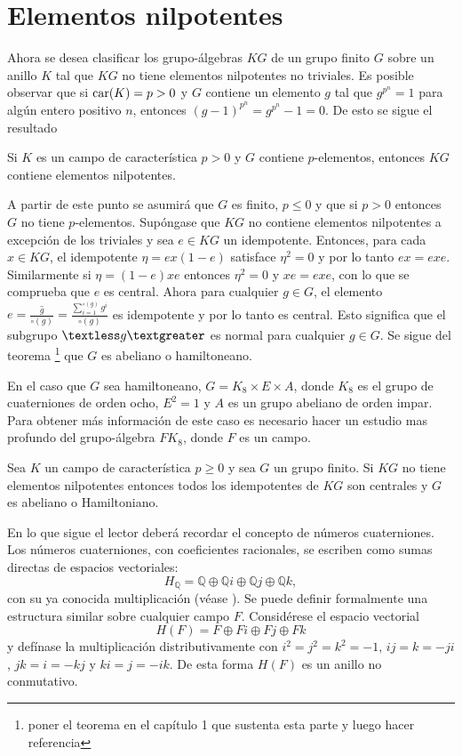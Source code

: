 \section{\quad Elementos nilpotentes}
Ahora se desea clasificar los grupo-álgebras $KG$ de un grupo finito $G$ sobre un anillo $K$ tal que $KG$ no tiene elementos nilpotentes no triviales. Es posible observar que si $\operatorname{car}(K) = p > 0$ y $G$ contiene un elemento $g$ tal que $g^{p^{n}} = 1$ para algún entero positivo $n$, entonces $(g - 1 )^{p^{n}} = g^{p^{n}} - 1 = 0$. De esto se sigue el resultado
\begin{proposicion}\label{prop:nilpotentes}
Si $K$ es un campo de característica $p > 0 $ y $G$ contiene $p$-elementos, entonces $KG$ contiene elementos nilpotentes.  
\end{proposicion}
A partir de este punto se asumirá que $G$ es finito, $p 
\leq 0$ y que si $p >0 $ entonces $G$ no tiene $p$-elementos. Supóngase que $KG$ no contiene elementos nilpotentes a excepción de los triviales y sea $e \in KG$ un idempotente. Entonces, para cada $x \in KG$, el idempotente $\eta = ex(1-e)$ satisface $\eta^2 = 0$ y por lo tanto $ ex = exe $. Similarmente si $\eta = (1 - e)xe$ entonces $\eta^2 = 0$ y $xe = exe$, con lo que se comprueba que $e$ es central. Ahora para cualquier $g \in G$, el elemento $e = \frac{\hat{g}}{\circ (g)} = \frac{\sum_{i = 1}^{\circ(g)}g^i}{\circ(g)}$ es idempotente y por lo tanto es central. Esto significa que el subgrupo $\textless g \textgreater$ es normal para cualquier $g \in G$. Se sigue del teorema \footnote{poner el teorema en el capítulo 1 que sustenta esta parte y luego hacer referencia} que $G$ es abeliano o hamiltoneano. 

En el caso que $G$ sea hamiltoneano, $G = K_8 \times E \times A$, donde $K_8$ es el grupo de cuaterniones de orden ocho, $E^2 = 1$ y $A$ es un grupo abeliano de orden impar. Para obtener más información de este caso es necesario hacer un estudio mas profundo del grupo-álgebra $FK_8$, donde $F$ es un campo.

\begin{proposicion}\label{prop:AH}
Sea $K$ un campo de característica $p \geq 0$ y sea $G$ un grupo finito. Si $KG$ no tiene elementos nilpotentes entonces todos los idempotentes de $KG$ son centrales y $G$ es abeliano o Hamiltoniano.
\end{proposicion}

En lo que sigue el lector deberá recordar el concepto de números cuaterniones. Los números cuaterniones, con coeficientes racionales, se escriben como sumas directas de espacios vectoriales:
\begin{equation*}
H_{\mathds{Q}} = \mathds{Q}\oplus\mathds{Q}i\oplus\mathds{Q}j\oplus\mathds{Q}k,
\end{equation*}
con su ya conocida multiplicación (véase \cite[p. 31]{bib:herstein}). Se puede definir formalmente una estructura similar sobre cualquier campo $F$. Considérese el espacio vectorial
\begin{equation*}
H(F) = F\oplus Fi\oplus Fj\oplus Fk 
\end{equation*} 
y defínase la multiplicación distributivamente con $i^2 = j^2 = k^2 = -1$, $ij = k = -ji$, $jk = i = -kj$ y $ki = j = -ik$. De esta forma $H(F)$ es un anillo no conmutativo.


